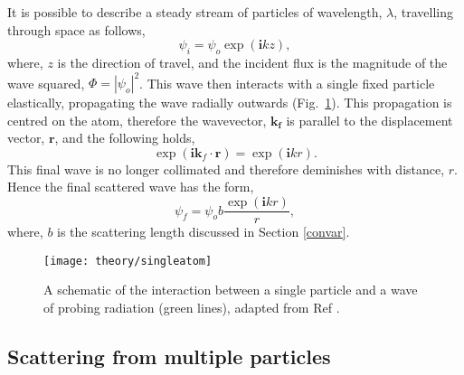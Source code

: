 It is possible to describe a steady stream of particles of wavelength, $\lambda$, travelling through space as follows,
%
\begin{equation}
	\psi_i = \psi_o \exp{(\mathbf{i} kz)},
	\label{equ:wave}
\end{equation}
%
where, $z$ is the direction of travel, and the incident flux is the magnitude of the wave squared, $\Phi = |\psi_o|^2$.
This wave then interacts with a single fixed particle elastically, propagating the wave radially outwards (Fig.~\ref{fig:singleatom}).
This propagation is centred on the atom, therefore the wavevector, $\mathbf{k_f}$ is parallel to the displacement vector, $\mathbf{r}$, and the following holds,
%
\begin{equation}
	\exp{(\mathbf{i}\mathbf{k}_f\cdot \mathbf{r})} = \exp{(\mathbf{i}kr)}.
\end{equation}
%
This final wave is no longer collimated and therefore deminishes with distance, $r$.
Hence the final scattered wave has the form,
%
\begin{equation}
	\psi_f = \psi_o b\frac{\exp{(\mathbf{i}kr)}}{r},
\end{equation}
%
where, $b$ is the scattering length discussed in Section \ref{convar}.
%
\begin{figure}
	\centering
	\texttt{[image: theory/singleatom]}
	\caption{A schematic of the interaction between a single particle and a wave of probing radiation (green lines), adapted from Ref \cite{Sivia2011}.}
	\label{fig:singleatom}
\end{figure}
%

\subsection{Scattering from multiple particles}
\label{sec:multiscat}

